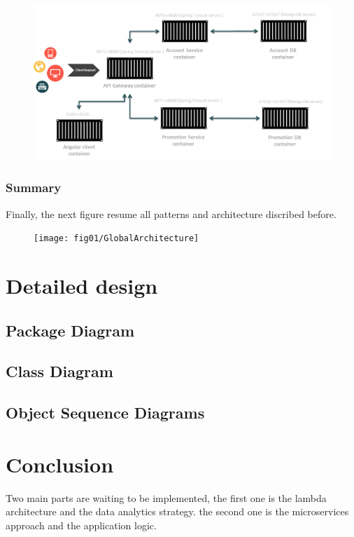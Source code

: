 \begin{figure}[h!]
	\centering
	\includegraphics[height=0.3\textheight]{fig01/MicroservicesDeployment}
	\label{fig:FilialesEtClients}
\end{figure}
\newpage

\subsubsection{ Summary }

Finally, the next figure resume all patterns and architecture discribed before.

\begin{figure}[h!]
	\centering
	\texttt{[image: fig01/GlobalArchitecture]}
	\label{fig:FilialesEtClients}
\end{figure}

\section{ Detailed design }
\subsection{ Package Diagram}
\subsection{ Class Diagram }
\subsection{Object Sequence Diagrams}
\section{ Conclusion }
\label{subsec:subsec01}
Two main parts are waiting to be implemented, the first one is the lambda architecture and the data analytics strategy. the second one is the microservices approach and the application logic.

